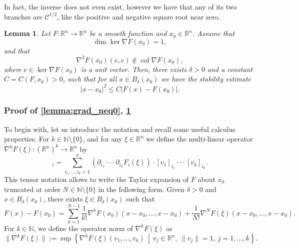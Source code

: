 \documentclass{amsart}
\newtheorem{lemma}{Lemma}[section]
\newtheorem{lemma}{Lemma}[section]  %
\def\R{{\mathbb{R}}}
\def\erre{{\mathbb{R}}}
\def\enne{{\mathbb{N}}}
\begin{document}
In fact, the inverse does not even exist, however we have that any of its two branches are $\mathcal{C}^{1/2}$, like the positive and negative square root near zero.
\begin{lemma} \label{lemma:ker_1dim}
    Let $F:\erre^n\to\erre^n$ be a smooth function and $x_0\in \R^n$. Assume that
    \begin{equation*}
        \dim\ker\nabla F(x_0)=1,
    \end{equation*}
    and that
    \begin{equation}
        \nabla^2F(x_0)(e,e)\notin \operatorname{col}\nabla F(x_0),
        \label{eq:1dimker_crucial_assumption}
    \end{equation}
    where $e\in\ker\nabla F(x_0)$ is a unit vector. Then, there exists $\delta>0$ and a constant $C=C(F,x_0)>0$, such that for all $x\in B_\delta(x_0)$ we have the stability estimate
    \begin{equation}\label{eq:ker_1dim}
        |x-x_0|^2\leq C|F(x)-F(x_0)|.
    \end{equation}
\end{lemma}

\subsubsection{Proof of \cref{lemma:grad_neq0}, \cref{lemma:ker_1dim}}
To begin with, let us introduce the notation and recall some useful calculus properties. For $k\in\enne\setminus\{0\}$, and for any $\xi\in\erre^n$ we define the multi-linear operator $\nabla^kF(\xi):(\erre^{n})^k\to\erre^n$ by
\begin{equation*}
    [\nabla^kF(\xi)(v_1,\dots,v_k)]_i=\sum_{i_1,\dots,i_k=1}^n(\partial_{i_1}\cdot\cdot\cdot\partial_{i_k}F_i(\xi))\cdot[v_1]_{i_1}\cdot\cdot\cdot[v_k]_{i_k}.
\end{equation*}
This tensor notation allows to write the Taylor expansion of $F$ about $x_0$ truncated at order $N\in\enne\setminus\{0\}$ in the following form. Given $\delta>0$ and $x\in B_\delta(x_0)$, there exists $\xi\in B_\delta(x_0)$ such that
\begin{equation}
    F(x)-F(x_0)=\sum_{k=1}^{N-1}\frac{1}{k!}\nabla^kF(x_0)(x-x_0,\dots,x-x_0)+\frac{1}{N!}\nabla^NF(\xi)(x-x_0,\dots,x-x_0). \label{eq:taylor_expansion}
\end{equation}
For $k\in\enne$, we define the operator norm of $\nabla^k F(\xi)$ as 
\begin{equation*}
    \|\nabla^k F(\xi)\|:=\sup\left\{\nabla^kF(\xi)(v_1,\dots,v_k)\,\middle\vert\, v_j\in\erre^n,\ \|v_j\|=1,\ j=1,\dots,k\right\}.
\end{equation*}
\end{document}
